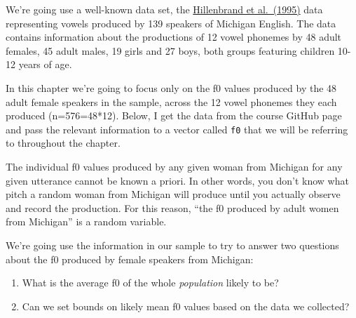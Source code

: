 \documentclass[
]{book}
\newenvironment{Shaded}{\begin{snugshade}}{\end{snugshade}}
\newcommand{\CommentTok}[1]{\textcolor[rgb]{0.56,0.35,0.01}{\textit{#1}}}
\newcommand{\FunctionTok}[1]{\textcolor[rgb]{0.00,0.00,0.00}{#1}}
\newcommand{\NormalTok}[1]{#1}
\newcommand{\OtherTok}[1]{\textcolor[rgb]{0.56,0.35,0.01}{#1}}
\newcommand{\SpecialCharTok}[1]{\textcolor[rgb]{0.00,0.00,0.00}{#1}}
\newcommand{\StringTok}[1]{\textcolor[rgb]{0.31,0.60,0.02}{#1}}
\begin{document}
We're going use a well-known data set, the \href{https://homepages.wmich.edu/~hillenbr/Papers/HillenbrandGettyClarkWheeler.pdf}{Hillenbrand et al.~(1995)} data representing vowels produced by 139 speakers of Michigan English. The data contains information about the productions of 12 vowel phonemes by 48 adult females, 45 adult males, 19 girls and 27 boys, both groups featuring children 10-12 years of age.

In this chapter we're going to focus only on the f0 values produced by the 48 adult female speakers in the sample, across the 12 vowel phonemes they each produced (n=576=48*12). Below, I get the data from the course GitHub page and pass the relevant information to a vector called \texttt{f0} that we will be referring to throughout the chapter.

\begin{Shaded}
\end{Shaded}

The individual f0 values produced by any given woman from Michigan for any given utterance cannot be known a priori. In other words, you don't know what pitch a random woman from Michigan will produce until you actually observe and record the production. For this reason, ``the f0 produced by adult women from Michigan'' is a random variable.

We're going use the information in our sample to try to answer two questions about the f0 produced by female speakers from Michigan:

\begin{enumerate}
\def\labelenumi{\arabic{enumi})}
\item
  What is the average f0 of the whole \emph{population} likely to be?
\item
  Can we set bounds on likely mean f0 values based on the data we collected?
\end{enumerate}
\end{document}
